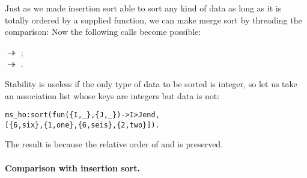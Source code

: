 Just as we made insertion sort able to sort any kind of data as long
as it is totally ordered by a supplied function, we can make merge
sort by threading the comparison:  Now the
following calls become possible:
\begin{center}
\(\twoheadrightarrow\) \erlcode{[0,1,2,3,4]};\\
\(\twoheadrightarrow\) \erlcode{[4,3,2,1,0]}.
\end{center}
Stability is useless if the only type of data to be sorted is integer,
so let us take an association list whose keys are integers but data is
not:
\begin{alltt}
ms_ho:sort(fun(\{I,_\},\{J,_\}) -> I > J end,
           [\{6,six\},\{1,one\},\{6,seis\},\{2,two\}]).
\end{alltt}
The result is 
because the relative order of  and
 is preserved.

\medskip

\paragraph{Comparison with insertion sort.}

